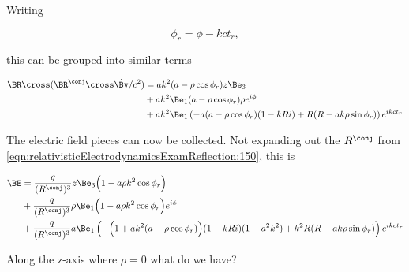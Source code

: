 Writing

\begin{equation}\label{eqn:relativisticElectrodynamicsExamReflection:640}
\phi_r = \phi - k c t_r,
\end{equation}

this can be grouped into similar terms

\begin{equation}\label{eqn:relativisticElectrodynamicsExamReflection:660}
\begin{aligned}
\BR \cross (\BR^\conj \cross \dot{\Bv}/c^2)
&=
a k^2 
(a - \rho \cos\phi_r) z \Be_3 \\
&+ 
a k^2 
\Be_1
(a - \rho \cos\phi_r) \rho e^{i\phi} \\
&+ 
a k^2 
\Be_1
\left(
-a (a - \rho \cos\phi_r) (1 - k R i)
+ R(R - a k \rho \sin \phi_r)
\right) e^{i k c t_r}
\end{aligned}
\end{equation}

The electric field pieces can now be collected.  Not expanding out the $R^\conj$ from \ref{eqn:relativisticElectrodynamicsExamReflection:150}, this is

\begin{equation}\label{eqn:relativisticElectrodynamicsExamReflection:700}
\begin{aligned}
\BE &= 
\frac{q}{(R^\conj)^3} z \Be_3
\Bigl( 1 - a \rho k^2 \cos\phi_r \Bigr) \\
&+
\frac{q}{(R^\conj)^3} \rho
\Be_1 \Bigl(1 - a \rho k^2 \cos\phi_r \Bigr) e^{i\phi} \\
&+
\frac{q}{(R^\conj)^3} a \Be_1
\left(
-\Bigl( 1 + a k^2 (a - \rho \cos\phi_r) \Bigr) (1 - k R i)(1 - a^2 k^2)
+ k^2 R(R - a k \rho \sin \phi_r)
\right) e^{i k c t_r}
\end{aligned}
\end{equation}

Along the z-axis where $\rho = 0$ what do we have?

